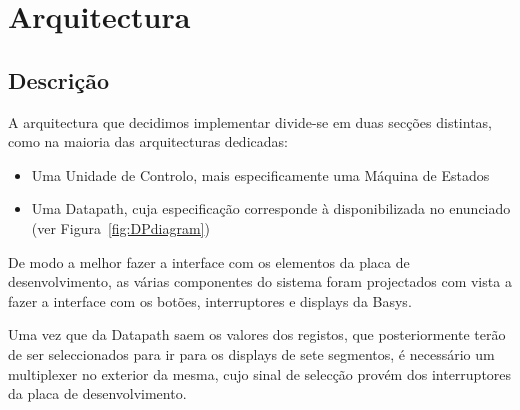 \documentclass[a4paper]{article}
\begin{document}


\tableofcontents
\pagebreak

\section{Arquitectura}
\subsection{Descrição}
A arquitectura que decidimos implementar divide-se em duas secções distintas, como na maioria das arquitecturas dedicadas:
\begin{itemize}
	\item Uma Unidade de Controlo, mais especificamente uma Máquina de Estados
	\item Uma Datapath, cuja especificação corresponde à disponibilizada no enunciado (ver Figura~\ref{fig:DPdiagram})
\end{itemize}

De modo a melhor fazer a interface com os elementos da placa de desenvolvimento, as várias componentes do sistema foram projectados com vista a fazer a interface com os botões, interruptores e displays da Basys.

Uma vez que da Datapath saem os valores dos registos, que posteriormente terão de ser seleccionados para ir para os displays de sete segmentos, é necessário um multiplexer no exterior da mesma, cujo sinal de selecção provém dos interruptores da placa de desenvolvimento.

\pagebreak
\end{document}
